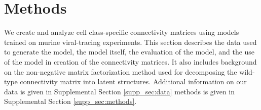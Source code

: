 \section{Methods}
\label{sec:methods}

We create and analyze cell class-specific connectivity matrices using models trained on murine viral-tracing experiments.
This section describes the data used to generate the model, the model itself, the evaluation of the model, and the use of the model in creation of the connectivity matrices.
It also includes background on the non-negative matrix factorization method used for decomposing the wild-type connectivity matrix into latent structures.
Additional information on our data is given in Supplemental Section \ref{supp_sec:data} methods is given in Supplemental Section \ref{supp_sec:methods}.

